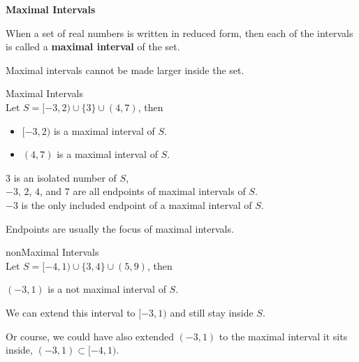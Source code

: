 \documentclass{ximera}
\begin{document}
\begin{definition} \textbf{\textcolor{green!50!black}{Maximal Intervals}}

When a set of real numbers is written in reduced form, then each of the intervals is called a \textbf{maximal interval} of the set.
\end{definition}
Maximal intervals cannot be made larger inside the set.  


\begin{example} Maximal Intervals \\
Let $S = [-3, 2) \cup \{ 3 \} \cup (4, 7)$, then

\begin{itemize}
\item $[-3, 2)$ is a maximal interval of $S$.
\item $(4, 7)$ is a maximal interval of $S$.
\end{itemize}


$3$ is an isolated number of $S$, \\

$-3$, $2$, $4$, and $7$ are all endpoints of maximal intervals of $S$. \\

$-3$ is the only included endpoint of a maximal interval of $S$.



\end{example}
Endpoints are usually the focus of maximal intervals.







\begin{example} nonMaximal Intervals \\
Let $S = [-4, 1) \cup \{ 3, 4 \} \cup (5, 9)$, then


$(-3, 1)$ is a not maximal interval of $S$.

We can extend this interval to $[-3, 1)$ and still stay inside $S$.


\end{example}
Or course, we could have also extended $(-3, 1)$ to the maximal interval it sits inside, $(-3, 1) \subset [-4, 1)$.
\end{document}
